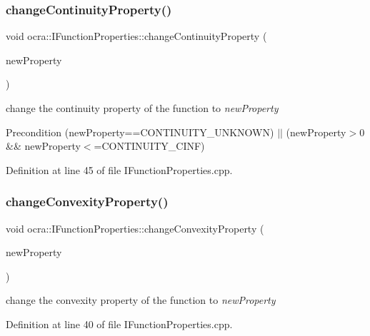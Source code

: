 \subsubsection{\texorpdfstring{change\+Continuity\+Property()}{changeContinuityProperty()}}
{\footnotesize\ttfamily void ocra\+::\+I\+Function\+Properties\+::change\+Continuity\+Property (\begin{DoxyParamCaption}\item[{int}]{new\+Property }\end{DoxyParamCaption})\hspace{0.3cm}{\ttfamily [protected]}}

change the continuity property of the function to {\itshape new\+Property} 

\begin{DoxyPrecond}{Precondition}
(new\+Property==C\+O\+N\+T\+I\+N\+U\+I\+T\+Y\+\_\+\+U\+N\+K\+N\+O\+WN) $\vert$$\vert$ (new\+Property$>$0 \&\& new\+Property$<$=C\+O\+N\+T\+I\+N\+U\+I\+T\+Y\+\_\+\+C\+I\+NF) 
\end{DoxyPrecond}


Definition at line 45 of file I\+Function\+Properties.\+cpp.

\hypertarget{classocra_1_1IFunctionProperties_a95fa18db8916e8671fed59cfdb40026c}{}\label{classocra_1_1IFunctionProperties_a95fa18db8916e8671fed59cfdb40026c} 
\subsubsection{\texorpdfstring{change\+Convexity\+Property()}{changeConvexityProperty()}}
{\footnotesize\ttfamily void ocra\+::\+I\+Function\+Properties\+::change\+Convexity\+Property (\begin{DoxyParamCaption}\item[{\hyperlink{namespaceocra_ae6e8dca6121e9618486a449754876119}{e\+Function\+Convexity}}]{new\+Property }\end{DoxyParamCaption})\hspace{0.3cm}{\ttfamily [protected]}}

change the convexity property of the function to {\itshape new\+Property} 

Definition at line 40 of file I\+Function\+Properties.\+cpp.

